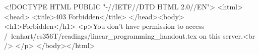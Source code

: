 <!DOCTYPE HTML PUBLIC "-//IETF//DTD HTML 2.0//EN">
<html><head>
<title>403 Forbidden</title>
</head><body>
<h1>Forbidden</h1>
<p>You don't have permission to access /~lenhart/cs356T/readings/linear_programming_handout.tex
on this server.<br />
</p>
</body></html>

